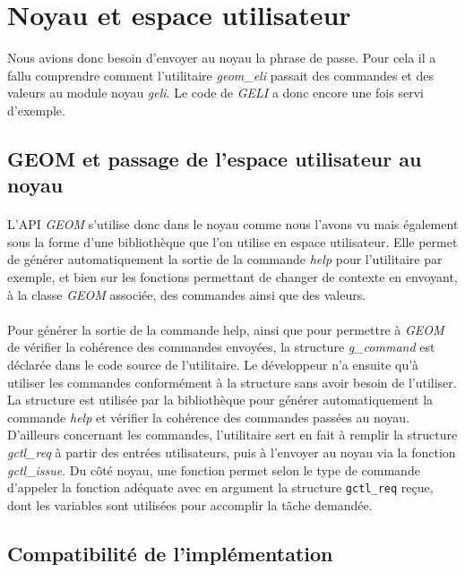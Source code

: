 \section{Noyau et espace utilisateur}
Nous avions donc besoin d'envoyer au noyau la phrase de passe. Pour cela il a
fallu comprendre comment l'utilitaire {\em geom\_eli} passait des commandes et
des valeurs au module noyau {\em geli}. Le code de {\em GELI} a donc encore une
fois servi d'exemple.

\subsection{GEOM et passage de l'espace utilisateur au noyau}
\paragraph{}
L'API {\em GEOM} s'utilise donc dans le noyau comme nous l'avons vu mais
également sous la forme d'une bibliothèque que l'on utilise en espace
utilisateur. Elle permet de générer automatiquement la sortie de la commande 
{\em help} pour l'utilitaire par exemple, et bien sur les fonctions permettant
de changer de contexte en envoyant, à la classe {\em GEOM} associée, des commandes
ainsi que des valeurs.

\paragraph{}
Pour générer la sortie de la commande help, ainsi que pour permettre à {\em
  GEOM} de vérifier la cohérence des commandes envoyées, la structure {\em
  g\_command} est déclarée dans le code source de l'utilitaire. Le développeur
n'a ensuite qu'à utiliser les commandes conformément à la structure sans avoir
besoin de l'utiliser. La structure est utilisée par la bibliothèque pour générer
automatiquement la commande {\em help} et vérifier la cohérence des commandes
passées au noyau. D'ailleurs concernant les commandes, l'utilitaire sert en fait
à remplir la structure {\em gctl\_req} à partir des entrées utilisateurs, puis
à l'envoyer au noyau via la fonction {\em gctl\_issue}. Du côté noyau, une
fonction permet selon le type de commande d'appeler la fonction adéquate avec en
argument la structure \texttt{gctl\_req} reçue, dont les variables sont
utilisées pour accomplir la tâche demandée.

\subsection{Compatibilité de l'implémentation}

